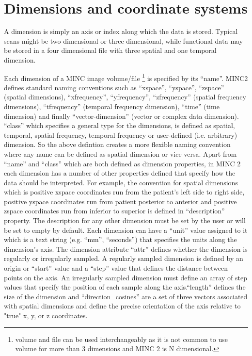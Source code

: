 \documentclass{article}
\begin{document}
\section{Dimensions and coordinate systems}
A dimension is simply an axis or index along which the data is stored.  
Typical scans might be two dimensional or three dimensional, while functional 
data may be stored in a four dimensional file with three spatial and one temporal 
dimension.

Each dimension of a MINC image volume/file \footnote {volume and file can 
be used interchangeably as it is not common to use volume for more than
3 dimensions and MINC 2 is N dimensional.} is specified by its ``name''. MINC2 defines
standard naming conventions such as ``xspace'', ``yspace'', ``zspace'' (spatial 
dimensions), ``xfrequency'', ``yfrequency'', ``zfrequency'' 
(spatial frequency dimensions), ``tfrequency'' (temporal frequency dimension), ``time'' 
(time dimension) and finally ``vector-dimension'' (vector or complex data dimension).
``class'' which specifies a general type for the dimensions, is defined as spatial, 
temporal, spatial frequency, temporal frequency or user-defined (i.e. arbitrary) dimension.
So the above defintion creates a more flexible naming convention where any name can be defined
as spatial dimension or vice versa. 
Apart from ``name'' and ``class'' which are both defined as dimension properties, 
in MINC 2 each dimension has a number 
of other properties defined that specify how the data should be interpreted.
For example, the convention for spatial dimensions which is positive xspace coordinates 
run from the patient's left side to right side, 
positive yspace coordinates run from patient posterior to anterior 
and positive zspace coordinates run from inferior to superior is defined in 
``description'' property. The description for any other dimension must be set by the user 
or will be set to empty by default. Each dimension can have a ``unit'' 
value assigned to it which is a text string (e.g. ``mm'', ``seconds'') that 
specifies the units along the dimension's axis. The dimension attribute ``attr''
defines whether the dimension is regularly or irregularly sampled. A regularly 
sampled dimension is defined by an origin or ``start'' value and a ``step'' 
value that defines the distance between points on the axis. An irregularly 
sampled dimension must define an array of step values that specify 
the position of each sample along the axis.``length'' defines the size of the dimension
and ``direction\_cosines'' are a set of three vectors associated with spatial dimensions
and define the precise orientation of the axis relative to "true" x, y, or z coordinates.
\end{document}
